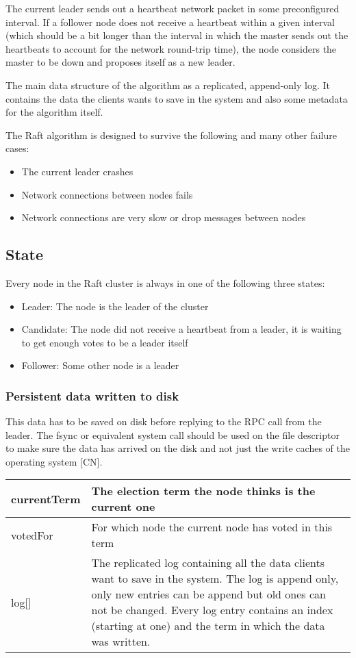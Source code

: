 The current leader sends out a heartbeat network packet in some preconfigured interval. If a follower node does not receive a heartbeat within a given interval (which should be a bit longer than the interval in which the master sends out the heartbeats to account for the network round-trip time), the node considers the master to be down and proposes itself as a new leader.

The main data structure of the algorithm as a replicated, append-only log. It contains the data the clients wants to save in the system and also some metadata
for the algorithm itself.

The Raft algorithm is designed to survive the following and many other failure cases:
\begin{itemize}
    \item The current leader crashes
    \item Network connections between nodes fails
    \item Network connections are very slow or drop messages between nodes
\end{itemize}

\subsection{State}
Every node in the Raft cluster is always in one of the following three states:
\begin{itemize}
    \item Leader: The node is the leader of the cluster
    \item Candidate: The node did not receive a heartbeat from a leader, it is waiting to get enough votes to be a leader itself
    \item Follower: Some other node is a leader
\end{itemize}

\subsubsection*{Persistent data written to disk}

This data has to be saved on disk before replying to the RPC call from the leader. The fsync or equivalent system call should be used on the file descriptor to make sure the data has arrived on the disk and not just the write caches of the operating system [CN].

\begin{tabular}{ | l | p{13.7cm} | }
\hline
currentTerm & The election term the node thinks is the current one \\ \hline
votedFor & For which node the current node has voted in this term \\ \hline
log[] & The replicated log containing all the data clients want to save in the system. The log is append only, only new entries can be append but old ones can not be changed.
Every log entry contains an index (starting at one) and the term in which the data was written. \\ \hline
\end{tabular}

